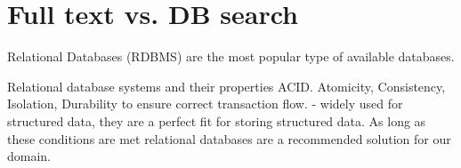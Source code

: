 %
%
%
%
%
%
%
%
%
%
%
%
%
%
%
%
%

\section{Full text vs. DB search}
\label{sec:fullVsDb}

Relational Databases (RDBMS) are the most popular type of available databases. 

Relational database systems and their properties ACID. Atomicity, Consistency, Isolation, Durability to ensure correct transaction flow. - widely used
for structured data, they are a perfect fit for storing structured
data. As long as these conditions are met relational databases are
a recommended solution for our domain.

